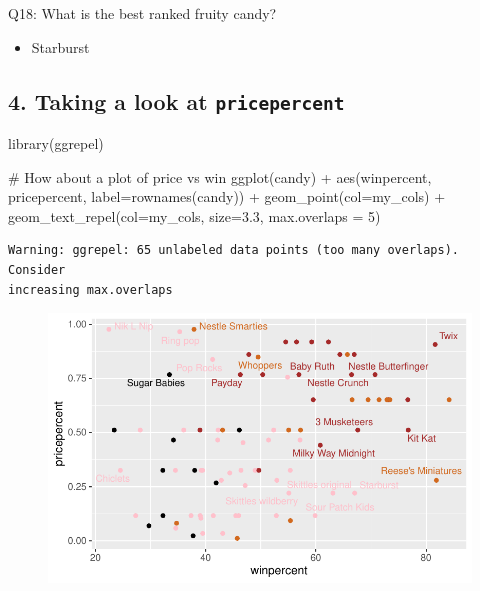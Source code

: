 \documentclass[
  letterpaper,
  DIV=11,
  numbers=noendperiod]{scrartcl}
\newenvironment{Shaded}{\begin{snugshade}}{\end{snugshade}}
\newcommand{\AttributeTok}[1]{\textcolor[rgb]{0.40,0.45,0.13}{#1}}
\newcommand{\CommentTok}[1]{\textcolor[rgb]{0.37,0.37,0.37}{#1}}
\newcommand{\DecValTok}[1]{\textcolor[rgb]{0.68,0.00,0.00}{#1}}
\newcommand{\FloatTok}[1]{\textcolor[rgb]{0.68,0.00,0.00}{#1}}
\newcommand{\FunctionTok}[1]{\textcolor[rgb]{0.28,0.35,0.67}{#1}}
\newcommand{\NormalTok}[1]{\textcolor[rgb]{0.00,0.23,0.31}{#1}}
\newcommand{\SpecialCharTok}[1]{\textcolor[rgb]{0.37,0.37,0.37}{#1}}
\providecommand{\tightlist}{%
  \setlength{\itemsep}{0pt}\setlength{\parskip}{0pt}}\usepackage{longtable,booktabs,array}
\begin{document}
Q18: What is the best ranked fruity candy?

\begin{itemize}
\tightlist
\item
  Starburst
\end{itemize}

\hypertarget{taking-a-look-at-pricepercent}{%
\subsection{\texorpdfstring{4. Taking a look at
\texttt{pricepercent}}{4. Taking a look at pricepercent}}\label{taking-a-look-at-pricepercent}}

\begin{Shaded}
\begin{Highlighting}[]
\FunctionTok{library}\NormalTok{(ggrepel)}

\CommentTok{\# How about a plot of price vs win}
\FunctionTok{ggplot}\NormalTok{(candy) }\SpecialCharTok{+}
  \FunctionTok{aes}\NormalTok{(winpercent, pricepercent, }\AttributeTok{label=}\FunctionTok{rownames}\NormalTok{(candy)) }\SpecialCharTok{+}
  \FunctionTok{geom\_point}\NormalTok{(}\AttributeTok{col=}\NormalTok{my\_cols) }\SpecialCharTok{+} 
  \FunctionTok{geom\_text\_repel}\NormalTok{(}\AttributeTok{col=}\NormalTok{my\_cols, }\AttributeTok{size=}\FloatTok{3.3}\NormalTok{, }\AttributeTok{max.overlaps =} \DecValTok{5}\NormalTok{)}
\end{Highlighting}
\end{Shaded}

\begin{verbatim}
Warning: ggrepel: 65 unlabeled data points (too many overlaps). Consider
increasing max.overlaps
\end{verbatim}

\begin{figure}[H]

{\centering \includegraphics{class10_project_files/figure-pdf/unnamed-chunk-16-1.pdf}

}

\end{figure}
\end{document}
